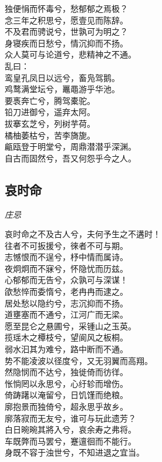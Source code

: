 \documentclass[]{article}
\begin{document}
独便悁而怀毒兮，愁郁郁之焉极？\\
念三年之积思兮，愿壹见而陈辞。\\
不及君而骋说兮，世孰可为明之？\\
身寝疾而日愁兮，情沉抑而不扬。\\
众人莫可与论道兮，悲精神之不通。\\
乱曰：\\
鸾皇孔凤日以远兮，畜凫驾鹅。\\
鸡鹜满堂坛兮，鼉黽游乎华池。\\
要褭奔亡兮，腾驾橐驼。\\
铅刀进御兮，遥弃太阿。\\
拔搴玄芝兮，列树芋荷。\\
橘柚萎枯兮，苦李旖旎。\\
甂瓯登于明堂兮，周鼎潜潜乎深渊。\\
自古而固然兮，吾又何怨乎今之人。

\hypertarget{header-n259}{%
\subsection{哀时命}\label{header-n259}}

\emph{庄忌}

哀时命之不及古人兮，夫何予生之不遘时！\\
往者不可扳援兮，徠者不可与期。\\
志憾恨而不逞兮，杼中情而属诗。\\
夜炯炯而不寐兮，怀隐忧而历兹。\\
心郁郁而无告兮，众孰可与深谋！\\
欿愁悴而委惰兮，老冉冉而逮之。\\
居处愁以隐约兮，志沉抑而不扬。\\
道壅塞而不通兮，江河广而无梁。\\
愿至昆仑之悬圃兮，采锺山之玉英。\\
揽瑶木之橝枝兮，望阆风之板桐。\\
弱水汩其为难兮，路中断而不通。\\
势不能凌波以径度兮，又无羽翼而高翔。\\
然隐悯而不达兮，独徙倚而彷徉。\\
怅惝罔以永思兮，心纡轸而增伤。\\
倚踌躇以淹留兮，日饥馑而绝粮。\\
廓抱景而独倚兮，超永思乎故乡。\\
廓落寂而无友兮，谁可与玩此遗芳？\\
白日晼晼其將入兮，哀余寿之弗将。\\
车既弊而马罢兮，蹇邅徊而不能行。\\
身既不容于浊世兮，不知进退之宜当。
\end{document}
